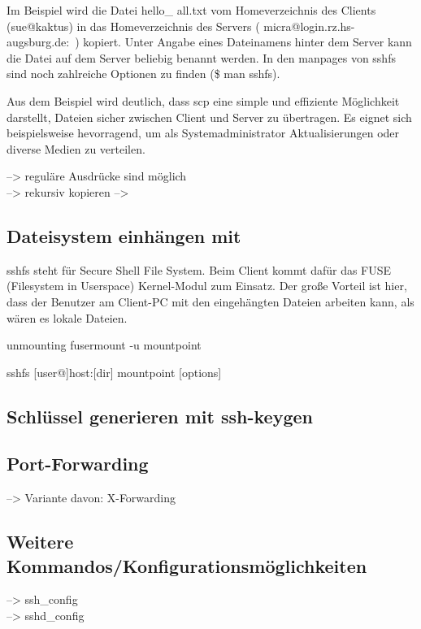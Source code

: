 \documentclass[ngerman,pdf]{wkcms}    %
\begin{document}
Im Beispiel wird die Datei \IT hello\_ \IT all.txt vom Homeverzeichnis des Clients (sue@kaktus) in das Homeverzeichnis des Servers ( micra@login.rz.hs-augsburg.de:~) kopiert. Unter Angabe eines Dateinamens hinter dem Server kann die Datei auf dem Server beliebig benannt werden. In den manpages von sshfs sind noch zahlreiche Optionen zu finden (\$ man sshfs).

Aus dem Beispiel wird deutlich, dass \IT scp eine simple und effiziente Möglichkeit darstellt, Dateien sicher zwischen Client und Server zu übertragen. Es eignet sich beispielsweise hevorragend, um als Systemadministrator Aktualisierungen oder diverse Medien zu verteilen. \cite[S. 80]{openssh_book}

--> reguläre Ausdrücke sind möglich \\
--> rekursiv kopieren
--> 

\subsection{Dateisystem einhängen mit }

\IT sshfs steht für \IT Secure \IT Shell \IT File \IT System. Beim Client kommt dafür das FUSE (Filesystem in Userspace) Kernel-Modul zum Einsatz. Der große Vorteil ist hier, dass der Benutzer am Client-PC mit den eingehängten Dateien arbeiten kann, als wären es lokale Dateien.

unmounting fusermount -u mountpoint


 

		 


\begin{program}
sshfs [user@]host:[dir] mountpoint [options]
\end{program}

\subsection{Schlüssel generieren mit \IT ssh-keygen}
\subsection{Port-Forwarding}
--> Variante davon: X-Forwarding
\subsection{Weitere Kommandos/Konfigurationsmöglichkeiten}
--> ssh\_config \\
--> sshd\_config \\
\end{document}
